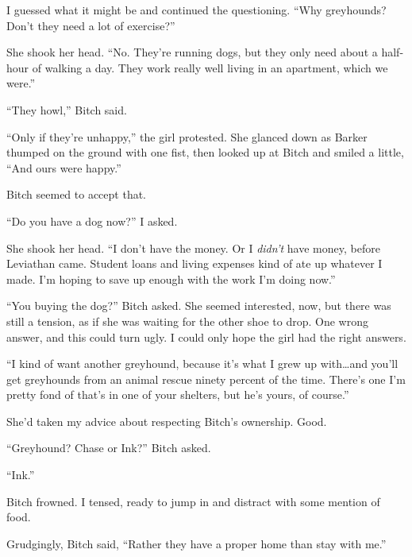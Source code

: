 I guessed what it might be and continued the questioning.  ``Why greyhounds?  Don't they need a lot of exercise?''



She shook her head.  ``No.  They're running dogs, but they only need about a half-hour of walking a day.  They work really well living in an apartment, which we were.''



``They howl,'' Bitch said.



``Only if they're unhappy,'' the girl protested.  She glanced down as Barker thumped on the ground with one fist, then looked up at Bitch and smiled a little, ``And ours were happy.''



Bitch seemed to accept that.



``Do you have a dog now?'' I asked.



She shook her head.  ``I don't have the money.  Or I \emph{didn't} have money, before Leviathan came.  Student loans and living expenses kind of ate up whatever I made.  I'm hoping to save up enough with the work I'm doing now.''



``You buying the dog?'' Bitch asked.  She seemed interested, now, but there was still a tension, as if she was waiting for the other shoe to drop.  One wrong answer, and this could turn ugly.  I could only hope the girl had the right answers.



``I kind of want another greyhound, because it's what I grew up with\ldots and you'll get greyhounds from an animal rescue ninety percent of the time.  There's one I'm pretty fond of that's in one of your shelters, but he's yours, of course.''



She'd taken my advice about respecting Bitch's ownership.  Good.



``Greyhound?  Chase or Ink?''  Bitch asked.



``Ink.''



Bitch frowned.  I tensed, ready to jump in and distract with some mention of food.



Grudgingly, Bitch said, ``Rather they have a proper home than stay with me.''



